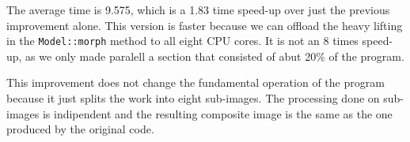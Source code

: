 \documentclass[12pt]{article}
\begin{document}
The average time is 9.575, which is a 1.83 time speed-up over just the previous improvement alone. This version
is faster because we can offload the heavy lifting in the \texttt{Model::morph} method to all eight CPU cores. It is not an 8 times speed-up, as we only made paralell a section that consisted of abut 20\% of the program.

This improvement does not change the fundamental operation of the program because it just splits the work
into eight sub-images. The processing done on sub-images is indipendent and the resulting composite image is the same as the one produced by the original code.
\end{document}
